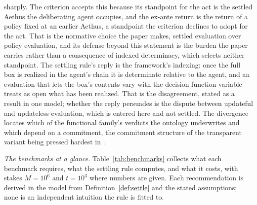 sharply. The criterion accepts this because its standpoint for the act is the settled Aethus the deliberating agent occupies, and the ex-ante return is the return of a policy fixed at an earlier Aethus, a standpoint the criterion declines to adopt for the act. That is the normative choice the paper makes, settled evaluation over policy evaluation, and its defense beyond this statement is the burden the paper carries rather than a consequence of indexed determinacy, which selects neither standpoint. The settling rule's reply is the framework's indexing: once the full box is realized in the agent's chain it is determinate relative to the agent, and an evaluation that lets the box's contents vary with the decision-function variable treats as open what has been realized. That is the disagreement, stated as a result in one model; whether the reply persuades is the dispute between updateful and updateless evaluation, which is entered here and not settled. The divergence locates which of the functional family's verdicts the ontology underwrites and which depend on a commitment, the commitment structure of the transparent variant being pressed hardest in \cite{drescher2006good}.

\noindent\textit{The benchmarks at a glance.} Table~\ref{tab:benchmarks} collects what each benchmark requires, what the settling rule computes, and what it costs, with stakes $M = 10^{6}$ and $t = 10^{3}$ where numbers are given. Each recommendation is derived in the model from Definition~\ref{def:settle} and the stated assumptions; none is an independent intuition the rule is fitted to.

